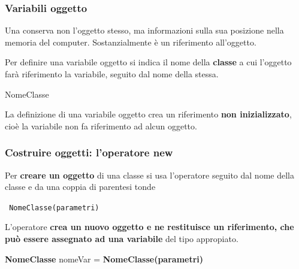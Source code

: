 \begin{frame}
\frametitle{Variabili oggetto}
\begin{block}{}
Una  conserva non l'oggetto stesso, ma informazioni sulla sua posizione nella memoria del computer.
Sostanzialmente è un \alert{riferimento} all'oggetto.
\end{block}
\begin{block}{}
Per definire una variabile oggetto si indica il nome della \textbf{classe} a cui l'oggetto farà riferimento la variabile,
seguito dal nome della  stessa.
\begin{center}
\alert{NomeClasse} 
\end{center}
\end{block}
\begin{block}{}
La definizione di una variabile oggetto crea un riferimento \textbf{non inizializzato}, cioè la variabile non fa riferimento ad 
alcun oggetto.
\end{block}
\end{frame}

\begin{frame}
\frametitle{Costruire oggetti: l'operatore new}
\begin{block}{}
Per \textbf{creare un oggetto} di una classe si usa l'operatore  seguito dal \alert{nome della classe} e da una coppia
di parentesi tonde
\begin{center}
\texttt{ \alert{NomeClasse}(parametri)}
\end{center}
\end{block}
\begin{block}{}
L'operatore  \textbf{crea un nuovo oggetto e ne restituisce un riferimento, che può essere assegnato ad una variabile}
del tipo appropiato.
\begin{center}
\textbf{NomeClasse} \alert{nomeVar} =  \textbf{NomeClasse(parametri)}
\end{center}
\end{block}
\end{frame}

